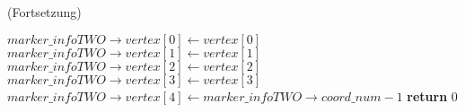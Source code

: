 \begin{algorithm}[ht]
\caption{ (Fortsetzung)}
\label{alg:checksquare-7}
\begin{algorithmic}[1]
	\State $\mathit{marker\_infoTWO \to vertex}[0] \gets \mathit{vertex}[0]$
	\label{alg:checksquare-7-savesxsy}
	\State $\mathit{marker\_infoTWO \to vertex}[1] \gets \mathit{vertex}[1]$
	\label{alg:checksquare-7-save1}
	\State $\mathit{marker\_infoTWO \to vertex}[2] \gets \mathit{vertex}[2]$
	\State $\mathit{marker\_infoTWO \to vertex}[3] \gets \mathit{vertex}[3]$
	\label{alg:checksquare-7-save3}
	\State $\mathit{marker\_infoTWO \to vertex}[4] \gets \mathit{marker\_infoTWO \to coord\_num} - 1$
	\label{alg:checksquare-7-savelast}
	\State \textbf{return} $0$
\end{algorithmic}
\end{algorithm}

